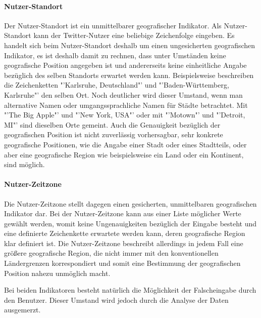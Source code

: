 				\paragraph{Nutzer-Standort} 
					
					Der Nutzer-Standort ist ein unmittelbarer geografischer Indikator.  
					Als Nutzer-Standort kann der Twitter-Nutzer eine beliebige Zeichenfolge eingeben. 
					Es handelt sich beim Nutzer-Standort deshalb um einen ungesicherten geografischen Indikator, es ist deshalb damit zu rechnen, dass unter Umständen keine geografische Position angegeben ist und andererseits keine einheitliche Angabe bezüglich des selben Standorts erwartet werden kann.
					Beispielsweise beschreiben die Zeichenketten "'Karlsruhe, Deutschland"' und "'Baden-Württemberg, Karlsruhe"' den selben Ort.
					Noch deutlicher wird dieser Umstand, wenn man alternative Namen oder umgangssprachliche Namen für Städte betrachtet. 
					Mit "'The Big Apple"' und "'New York, USA"' oder mit "'Motown"' und "'Detroit, MI"' sind dieselben Orte gemeint.   
					Auch die Genauigkeit bezüglich der geografischen Position ist nicht zuverlässig vorhersagbar, sehr konkrete geografische Positionen, wie die Angabe einer Stadt oder eines Stadtteils, oder aber eine geografische Region wie beispielsweise ein Land oder ein Kontinent, sind möglich. 


				\paragraph{Nutzer-Zeitzone} 

					Die Nutzer-Zeitzone stellt dagegen einen gesicherten, unmittelbaren geografischen Indikator dar.
					Bei der Nutzer-Zeitzone kann aus einer Liste möglicher Werte gewählt werden, womit keine Ungenauigkeiten bezüglich der Eingabe besteht und eine definierte Zeichenkette erwartete werden kann, deren geografische Region klar definiert ist. 
					Die Nutzer-Zeitzone beschreibt allerdings in jedem Fall eine größere geografische Region, die nicht immer mit den konventionellen Ländergrenzen korrespondiert und somit eine Bestimmung der geografischen Position nahezu unmöglich macht.

					Bei beiden Indikatoren besteht natürlich die Möglichkeit der Falscheingabe durch den Benutzer. Dieser Umstand wird jedoch durch die Analyse der Daten ausgemerzt.  


